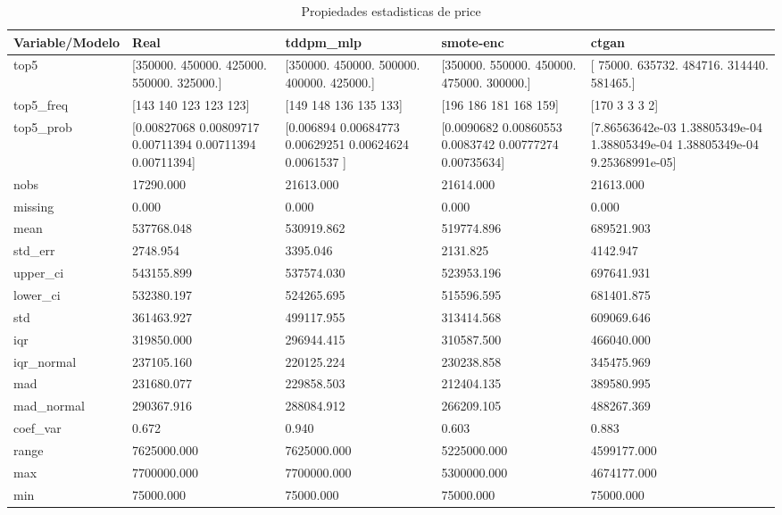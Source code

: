 \begin{table}[H]
\centering
\caption{Propiedades  estadisticas de price}
\label{table-stats-price}
\begin{tabular}{|l|m{10em}|m{10em}|m{10em}|m{10em}|}
\hline
 \rowcolor[gray]{0.8}
Variable/Modelo & Real & tddpm\_mlp & smote-enc & ctgan \\
\hline top5 & [350000. 450000. 425000. 550000. 325000.] & [350000. 450000. 500000. 400000. 425000.] & [350000. 550000. 450000. 475000. 300000.] & [ 75000. 635732. 484716. 314440. 581465.] \\
\hline top5\_freq & [143 140 123 123 123] & [149 148 136 135 133] & [196 186 181 168 159] & [170   3   3   3   2] \\
\hline top5\_prob & [0.00827068 0.00809717 0.00711394 0.00711394 0.00711394] & [0.006894   0.00684773 0.00629251 0.00624624 0.0061537 ] & [0.0090682  0.00860553 0.0083742  0.00777274 0.00735634] & [7.86563642e-03 1.38805349e-04 1.38805349e-04 1.38805349e-04
 9.25368991e-05] \\
\hline nobs & 17290.000 & 21613.000 & 21614.000 & 21613.000 \\
\hline missing & 0.000 & 0.000 & 0.000 & 0.000 \\
\hline mean & 537768.048 & 530919.862 & 519774.896 & 689521.903 \\
\hline std\_err & 2748.954 & 3395.046 & 2131.825 & 4142.947 \\
\hline upper\_ci & 543155.899 & 537574.030 & 523953.196 & 697641.931 \\
\hline lower\_ci & 532380.197 & 524265.695 & 515596.595 & 681401.875 \\
\hline std & 361463.927 & 499117.955 & 313414.568 & 609069.646 \\
\hline iqr & 319850.000 & 296944.415 & 310587.500 & 466040.000 \\
\hline iqr\_normal & 237105.160 & 220125.224 & 230238.858 & 345475.969 \\
\hline mad & 231680.077 & 229858.503 & 212404.135 & 389580.995 \\
\hline mad\_normal & 290367.916 & 288084.912 & 266209.105 & 488267.369 \\
\hline coef\_var & 0.672 & 0.940 & 0.603 & 0.883 \\
\hline range & 7625000.000 & 7625000.000 & 5225000.000 & 4599177.000 \\
\hline max & 7700000.000 & 7700000.000 & 5300000.000 & 4674177.000 \\
\hline min & 75000.000 & 75000.000 & 75000.000 & 75000.000 \\

\end{tabular}
\end{table}
